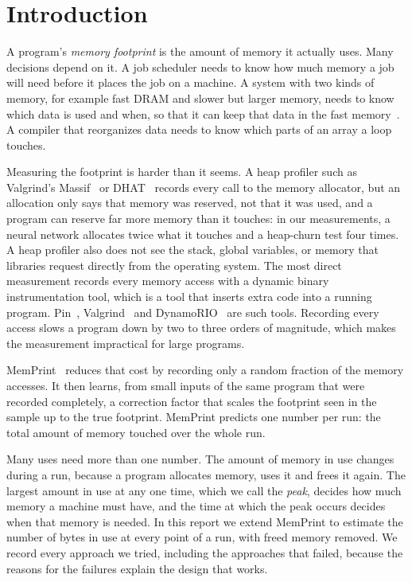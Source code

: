 \documentclass[11pt]{article}
\newcommand{\memprint}{MemPrint}
\newcommand{\term}[1]{\emph{#1}}
\begin{document}
\tableofcontents
\newpage

\section{Introduction}
\label{sec:intro}

A program's \term{memory footprint} is the amount of memory it actually uses. Many decisions depend on it. A job scheduler needs to know how much memory a job will need before it places the job on a machine. A system with two kinds of memory, for example fast DRAM and slower but larger memory, needs to know which data is used and when, so that it can keep that data in the fast memory~\cite{agarwal2017thermostat,raybuck2021hemem}. A compiler that reorganizes data needs to know which parts of an array a loop touches.

Measuring the footprint is harder than it seems. A heap profiler such as Valgrind's Massif~\cite{ValgrindMassif} or DHAT~\cite{dhat} records every call to the memory allocator, but an allocation only says that memory was reserved, not that it was used, and a program can reserve far more memory than it touches: in our measurements, a neural network allocates twice what it touches and a heap-churn test four times. A heap profiler also does not see the stack, global variables, or memory that libraries request directly from the operating system. The most direct measurement records every memory access with a dynamic binary instrumentation tool, which is a tool that inserts extra code into a running program. Pin~\cite{Luk2005Pin}, Valgrind~\cite{Nethercote2007Valgrind} and DynamoRIO~\cite{bruening2003dynamorio} are such tools. Recording every access slows a program down by two to three orders of magnitude, which makes the measurement impractical for large programs.

\memprint{}~\cite{memprint} reduces that cost by recording only a random fraction of the memory accesses. It then learns, from small inputs of the same program that were recorded completely, a correction factor that scales the footprint seen in the sample up to the true footprint. \memprint{} predicts one number per run: the total amount of memory touched over the whole run.

Many uses need more than one number. The amount of memory in use changes during a run, because a program allocates memory, uses it and frees it again. The largest amount in use at any one time, which we call the \term{peak}, decides how much memory a machine must have, and the time at which the peak occurs decides when that memory is needed. In this report we extend \memprint{} to estimate the number of bytes in use at every point of a run, with freed memory removed. We record every approach we tried, including the approaches that failed, because the reasons for the failures explain the design that works.
\end{document}
